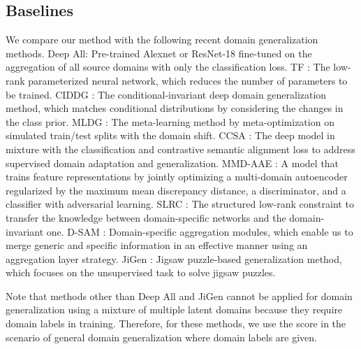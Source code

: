 \documentclass[letterpaper]{article} \usepackage{aaai20}  \usepackage{times}  \usepackage{helvet} \usepackage{courier}  \usepackage[hyphens]{url}  \usepackage{graphicx} \urlstyle{rm} \def\UrlFont{\rm}  \usepackage{graphicx}  \usepackage[whole]{bxcjkjatype}
\begin{document}
\subsection{Baselines}
We compare our method with the following recent domain generalization methods.
Deep All: Pre-trained Alexnet or ResNet-18 fine-tuned on the aggregation of all source domains with only the classification loss.
TF \cite{PACS}: The low-rank parameterized neural network, which reduces the number of parameters to be trained.
CIDDG \cite{CIDDG}: The conditional-invariant deep domain generalization method, which matches conditional distributions by considering the changes in the class prior.
MLDG \cite{MLDG}: The meta-learning method by meta-optimization on simulated train/test splits with the domain shift.
CCSA \cite{CCSA}: The deep model in mixture with the classification and contrastive semantic alignment loss to address supervised domain adaptation and generalization.
MMD-AAE \cite{MMD_AAE}: A model that trains feature representations by jointly optimizing a multi-domain autoencoder regularized by the maximum mean discrepancy distance, a discriminator, and a classifier with adversarial learning.
SLRC \cite{SLRC}: The structured low-rank constraint to transfer the knowledge between domain-specific networks and the domain-invariant one.
D-SAM \cite{D_SAM}: Domain-specific aggregation modules, which enable us to merge generic and specific information in an effective manner using an aggregation layer strategy.
JiGen \cite{JiGen}: Jigsaw puzzle-based generalization method, which focuses on the unsupervised task to solve jigsaw puzzles.\par
Note that methods other than Deep All and JiGen cannot be applied for domain generalization using a mixture of multiple latent domains because they require domain labels in training.
Therefore, for these methods, we use the score in the scenario of general domain generalization where domain labels are given.
\end{document}
